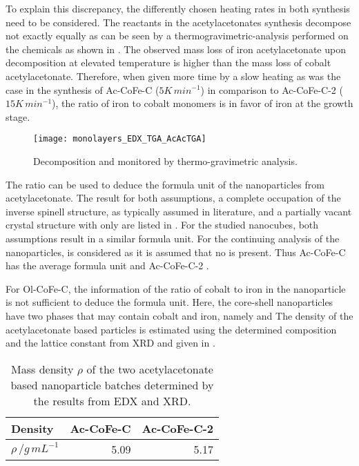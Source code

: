 \documentclass[\main/dresen_thesis.tex]{subfiles}
\begin{document}
  To explain this discrepancy, the differently chosen heating rates in both synthesis need to be considered.
  The reactants in the acetylacetonates synthesis decompose not exactly equally as can be seen by a thermogravimetric-analysis performed on the chemicals as shown in .
  The observed mass loss of iron acetylacetonate upon decomposition at elevated temperature is higher than the mass loss of cobalt acetylacetonate.
  Therefore, when given more time by a slow heating as was the case in the synthesis of Ac-CoFe-C ($5 \unit{K \, min^{-1}}$) in comparison to Ac-CoFe-C-2  ($15 \unit{K \, min^{-1}}$), the ratio of iron to cobalt monomers is in favor of iron at the growth stage.
  \begin{figure}[tb]
    \centering
    \texttt{[image: monolayers\_EDX\_TGA\_AcAcTGA]}
    \caption{\label{fig:monolayers:nanoparticle:edx:TGARefluxAcAc}Decomposition   and  monitored by thermo-gravimetric analysis.}
  \end{figure}

  The ratio can be used to deduce the formula unit of the nanoparticles from acetylacetonate.
  The result for both assumptions, a complete occupation of the inverse spinell structure, as typically assumed in literature, and a partially vacant crystal structure with only  are listed in .
  For the studied nanocubes, both assumptions result in a similar formula unit.
  For the continuing analysis of the nanoparticles,  is considered as it is assumed that no  is present.
  Thus Ac-CoFe-C has the average formula unit  and Ac-CoFe-C-2 .

  For Ol-CoFe-C, the information of the ratio of cobalt to iron in the nanoparticle is not sufficient to deduce the formula unit. Here, the core-shell nanoparticles have two phases that may contain cobalt and iron, namely  and 
  The density of the acetylacetonate based particles is estimated using the determined composition and the lattice constant from XRD  and given in .

  \begin{table}[ht]
    \centering
    \caption{\label{tab:monolayers:nanoparticles:density}Mass density $\rho$ of the two acetylacetonate based nanoparticle batches determined by the results from EDX and XRD.}
    \begin{tabular}{ l | r | r }
       Density                & \textbf{Ac-CoFe-C} & \textbf{Ac-CoFe-C-2}\\
      \hline
      \rule{0pt}{2ex} $\rho \, / \unit{g \, mL^{-1}}$  & 5.09               & 5.17\\
      \hline
    \end{tabular}
  \end{table}
\end{document}
